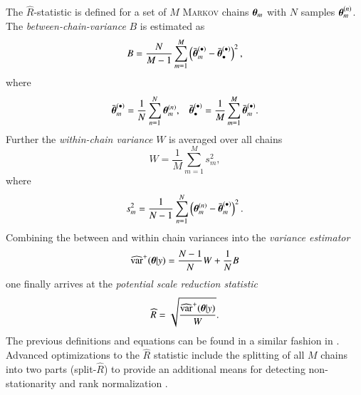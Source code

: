 The $\widehat{R}$-statistic is defined for a set of $M$ \textsc{Markov} chains $\boldsymbol{\theta}_m$ with $N$ samples $\boldsymbol{\theta}_m^{(n)}$. The \emph{between-chain-variance} $B$ is estimated as \begin{equation}
	B=\frac{N}{M-1}\sum_{m=1}^{M}\left(\bar{\boldsymbol{\theta}}_m^{(\bullet)}-\bar{\boldsymbol{\theta}}^{(\bullet)}_\bullet\right)^2,
\end{equation}
where
\begin{align}
	\bar{\boldsymbol{\theta}}_m^{(\bullet)}=\frac{1}{N}\sum_{n=1}^{N}\boldsymbol{\theta}_m^{(n)}, && \bar{\boldsymbol{\theta}}^{(\bullet)}_\bullet=\frac{1}{M}\sum_{m=1}^{M}\bar{\boldsymbol{\theta}}_m^{(\bullet)}. 
\end{align}
Further the \emph{within-chain variance} $W$ is averaged over all chains
\begin{equation}
	W=\frac{1}{M}\sum_{m=1}^{M}s_m^2,
\end{equation}
where \begin{equation}
	s_m^2=\frac{1}{N-1}\sum_{n=1}^{N}\left(\boldsymbol{\theta}_m^{(n)}-\bar{\boldsymbol{\theta}}_m^{(\bullet)}\right)^2.
\end{equation}
Combining the between and within chain variances into the \emph{variance estimator}
\begin{equation}
	\widehat{\text{var}}^+(\boldsymbol{\theta}|y)=\frac{N-1}{N}W+\frac{1}{N}B
\end{equation}
one finally arrives at the \emph{potential scale reduction statistic}
\begin{equation}
	\widehat{R}=\sqrt{\frac{\widehat{\text{var}}^+(\boldsymbol{\theta}|y)}{W}}.
\end{equation} 
The previous definitions and equations can be found in a similar fashion in \cite{stan}. Advanced optimizations to the $\widehat{R}$ statistic include the splitting of all $M$ chains into two parts (split-$\widehat{R}$) to provide an additional means for detecting non-stationarity \cite{stan} and rank normalization \cite{rhat}.
